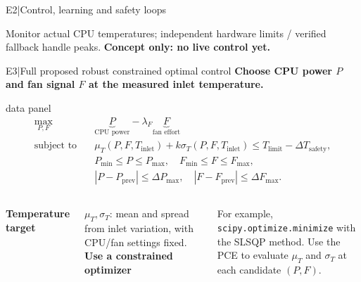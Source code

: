 \begin{frame}[more-space,label=backup-E2]{E2\enspace|\enspace Control, learning and safety loops}
{
  }
  \par\smallskip
  \enspace
  {\footnotesize Monitor actual CPU temperatures;
    independent hardware limits / verified fallback handle peaks.
    \textbf{Concept only: no live control yet.}}\par
\end{frame}

\renewcommand{\backupcode}{E3}

\begin{frame}[more-space,label=backup-E3]{E3\enspace|\enspace Full proposed robust constrained optimal control}
  {\small\textbf{Choose CPU power $P$ and fan signal $F$ at the measured inlet temperature.}}
  \par\vfill
  \begin{beamercolorbox}[sep=3mm,wd=\textwidth]{data panel}
    \small
    \setlength{\abovedisplayskip}{3pt}
    \setlength{\belowdisplayskip}{3pt}
    \[
      \begin{aligned}
        \max_{P,F}\quad &
          \underbrace{P}_{\text{CPU power}}
          -\lambda_F\underbrace{F}_{\text{fan effort}}\\[3mm]
        \text{subject to}\quad
        &\mu_T(P,F,T_{\mathrm{inlet}})+k\sigma_T(P,F,T_{\mathrm{inlet}})
          \leq T_{\mathrm{limit}}-\Delta T_{\mathrm{safety}},\\[1mm]
        &P_{\min}\leq P\leq P_{\max},\quad
          F_{\min}\leq F\leq F_{\max},\\[1mm]
        &|P-P_{\mathrm{prev}}|\leq\Delta P_{\max},\quad
          |F-F_{\mathrm{prev}}|\leq\Delta F_{\max}.
      \end{aligned}
    \]
  \end{beamercolorbox}
  \par\vfill
  \begin{columns}[T,onlytextwidth]
      \footnotesize
      \textbf{Temperature target}\par
      $\mu_T,\sigma_T$: mean and spread from inlet variation, with CPU/fan settings fixed.
      \footnotesize
      \textbf{Use a constrained optimizer}\par
      For example, \texttt{scipy.optimize.minimize} with the SLSQP method.
      Use the PCE to evaluate $\mu_T$ and $\sigma_T$ at each candidate $(P,F)$.
  \end{columns}
\end{frame}

